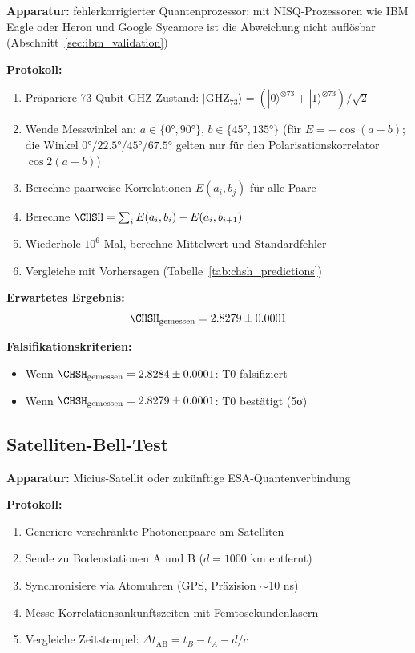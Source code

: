 \textbf{Apparatur:} fehlerkorrigierter Quantenprozessor; mit NISQ-Prozessoren wie IBM Eagle oder Heron und Google Sycamore ist die Abweichung nicht auflösbar (Abschnitt~\ref{sec:ibm_validation})

\textbf{Protokoll:}
\begin{enumerate}
	\item Präpariere 73-Qubit-GHZ-Zustand: $|\text{GHZ}_{73}\rangle = (|0\rangle^{\otimes 73} + |1\rangle^{\otimes 73})/\sqrt{2}$
	\item Wende Messwinkel an: $a \in \{0°, 90°\}$, $b \in \{45°, 135°\}$ (für $E = -\cos(a-b)$; die Winkel $0°/22.5°/45°/67.5°$ gelten nur für den Polarisationskorrelator $\cos 2(a-b)$)
	\item Berechne paarweise Korrelationen $E(a_i, b_j)$ für alle Paare
	\item Berechne $\CHSH = \sum_i E(a_i, b_i) - E(a_i, b_{i+1})$
	\item Wiederhole $10^6$ Mal, berechne Mittelwert und Standardfehler
	\item Vergleiche mit Vorhersagen (Tabelle~\ref{tab:chsh_predictions})
\end{enumerate}

\textbf{Erwartetes Ergebnis:}
\begin{equation}
	\CHSH_{\text{gemessen}} = 2.8279 \pm 0.0001
\end{equation}

\textbf{Falsifikationskriterien:}
\begin{itemize}
	\item Wenn $\CHSH_{\text{gemessen}} = 2.8284 \pm 0.0001$: T0 falsifiziert
	\item Wenn $\CHSH_{\text{gemessen}} = 2.8279 \pm 0.0001$: T0 bestätigt (5σ)
\end{itemize}

\subsection{Satelliten-Bell-Test}

\textbf{Apparatur:} Micius-Satellit oder zukünftige ESA-Quantenverbindung

\textbf{Protokoll:}
\begin{enumerate}
	\item Generiere verschränkte Photonenpaare am Satelliten
	\item Sende zu Bodenstationen A und B ($d = 1000$ km entfernt)
	\item Synchronisiere via Atomuhren (GPS, Präzision $\sim$10 ns)
	\item Messe Korrelationsankunftszeiten mit Femtosekundenlasern
	\item Vergleiche Zeitstempel: $\Delta t_{\text{AB}} = t_B - t_A - d/c$
\end{enumerate}

